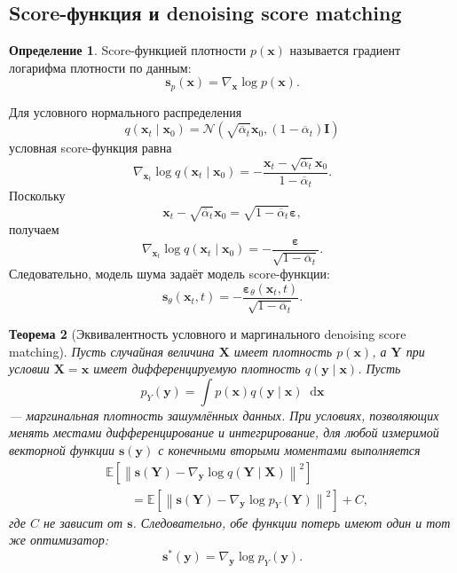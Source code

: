 \documentclass[12pt,a4paper]{article}
\newtheorem{theorem}{Теорема}[section]
\theoremstyle{definition}
\newtheorem{definition}[theorem]{Определение}
\newcommand{\E}{\mathbb{E}}
\newcommand{\N}{\mathcal{N}}
\newcommand{\dd}{\mathop{}\!\mathrm{d}}
\newcommand{\eps}{\varepsilon}
\newcommand{\1}{\mathbf{1}}
\begin{document}
\subsection{Score-функция и denoising score matching}

\begin{definition}
Score-функцией плотности $p(\bm{x})$ называется градиент логарифма
плотности по данным:
\[
    \bm{s}_p(\bm{x})
    =
    \nabla_{\bm{x}}\log p(\bm{x}).
\]
\end{definition}

Для условного нормального распределения
\[
    q(\bm{x}_t\mid\bm{x}_0)
    =
    \N\left(
        \sqrt{\overline{\alpha}_t}\bm{x}_0,
        (1-\overline{\alpha}_t)\bm{I}
    \right)
\]
условная score-функция равна
\[
    \nabla_{\bm{x}_t}
    \log q(\bm{x}_t\mid\bm{x}_0)
    =
    -
    \frac{
        \bm{x}_t-\sqrt{\overline{\alpha}_t}\bm{x}_0
    }{
        1-\overline{\alpha}_t
    }.
\]
Поскольку
\[
    \bm{x}_t-\sqrt{\overline{\alpha}_t}\bm{x}_0
    =
    \sqrt{1-\overline{\alpha}_t}\bm{\eps},
\]
получаем
\[
    \nabla_{\bm{x}_t}
    \log q(\bm{x}_t\mid\bm{x}_0)
    =
    -
    \frac{\bm{\eps}}
         {\sqrt{1-\overline{\alpha}_t}}.
\]
Следовательно, модель шума задаёт модель score-функции:
\[
    \bm{s}_\theta(\bm{x}_t,t)
    =
    -
    \frac{
        \bm{\eps}_\theta(\bm{x}_t,t)
    }{
        \sqrt{1-\overline{\alpha}_t}
    }.
\]

\begin{theorem}[Эквивалентность условного и маргинального
denoising score matching]
Пусть случайная величина $\bm{X}$ имеет плотность $p(\bm{x})$, а
$\bm{Y}$ при условии $\bm{X}=\bm{x}$ имеет дифференцируемую плотность
$q(\bm{y}\mid\bm{x})$. Пусть
\[
    p_Y(\bm{y})
    =
    \int p(\bm{x})q(\bm{y}\mid\bm{x})\dd\bm{x}
\]
--- маргинальная плотность зашумлённых данных. При условиях,
позволяющих менять местами дифференцирование и интегрирование,
для любой измеримой векторной функции $\bm{s}(\bm{y})$ с конечными
вторыми моментами выполняется
\begin{align*}
    &\E
    \left[
        \left\|
            \bm{s}(\bm{Y})
            -
            \nabla_{\bm{y}}
            \log q(\bm{Y}\mid\bm{X})
        \right\|^2
    \right]\\
    &\qquad=
    \E
    \left[
        \left\|
            \bm{s}(\bm{Y})
            -
            \nabla_{\bm{y}}\log p_Y(\bm{Y})
        \right\|^2
    \right]
    +C,
\end{align*}
где $C$ не зависит от $\bm{s}$. Следовательно, обе функции потерь
имеют один и тот же оптимизатор:
\[
    \bm{s}^{*}(\bm{y})
    =
    \nabla_{\bm{y}}\log p_Y(\bm{y}).
\]
\end{theorem}
\end{document}
